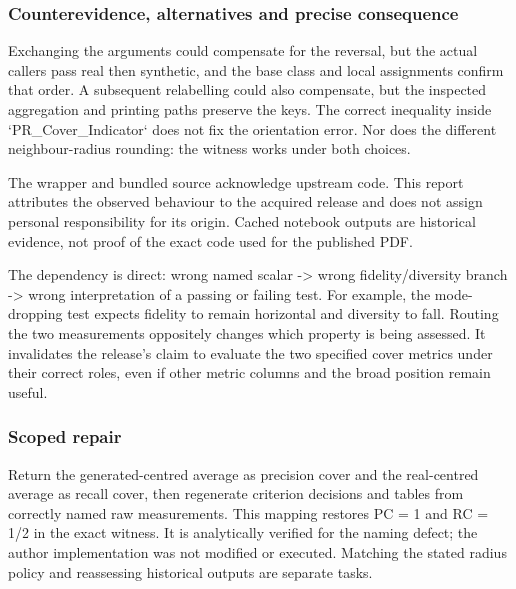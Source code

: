 \documentclass[10pt]{article}
\begin{document}
\subsubsection*{Counterevidence, alternatives and precise consequence}
Exchanging the arguments could compensate for the reversal, but the actual callers pass real then synthetic, and the base class and local assignments confirm that order. A subsequent relabelling could also compensate, but the inspected aggregation and printing paths preserve the keys. The correct inequality inside `PR\_Cover\_Indicator` does not fix the orientation error. Nor does the different neighbour-radius rounding: the witness works under both choices.\par
The wrapper and bundled source acknowledge upstream code. This report attributes the observed behaviour to the acquired release and does not assign personal responsibility for its origin. Cached notebook outputs are historical evidence, not proof of the exact code used for the published PDF.\par
The dependency is direct: wrong named scalar -> wrong fidelity/diversity branch -> wrong interpretation of a passing or failing test. For example, the mode-dropping test expects fidelity to remain horizontal and diversity to fall. Routing the two measurements oppositely changes which property is being assessed. It invalidates the release’s claim to evaluate the two specified cover metrics under their correct roles, even if other metric columns and the broad position remain useful.\par
\subsubsection*{Scoped repair}
Return the generated-centred average as precision cover and the real-centred average as recall cover, then regenerate criterion decisions and tables from correctly named raw measurements. This mapping restores PC = 1 and RC = 1/2 in the exact witness. It is analytically verified for the naming defect; the author implementation was not modified or executed. Matching the stated radius policy and reassessing historical outputs are separate tasks.\par
\end{document}
